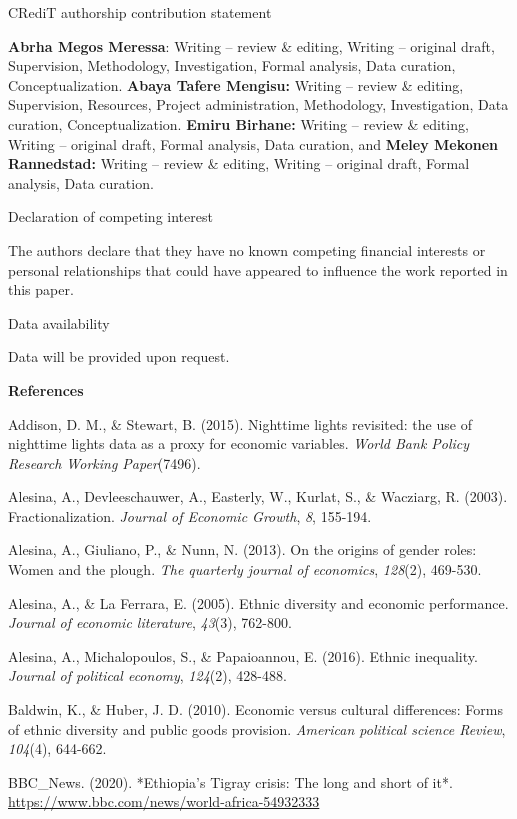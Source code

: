 CRediT authorship contribution statement

\textbf{Abrha Megos Meressa}: Writing -- review \& editing, Writing --
original draft, Supervision, Methodology, Investigation, Formal
analysis, Data curation, Conceptualization. \textbf{Abaya Tafere
Mengisu:} Writing -- review \& editing, Supervision, Resources, Project
administration, Methodology, Investigation, Data curation,
Conceptualization. \textbf{Emiru Birhane:} Writing -- review \& editing,
Writing -- original draft, Formal analysis, Data curation, and
\textbf{Meley Mekonen Rannedstad:} Writing -- review \& editing, Writing
-- original draft, Formal analysis, Data curation.

Declaration of competing interest

The authors declare that they have no known competing financial
interests or personal relationships that could have appeared to
influence the work reported in this paper.

Data availability

Data will be provided upon request.

\textbf{References}

Addison, D. M., \& Stewart, B. (2015). Nighttime lights revisited: the
use of nighttime lights data as a proxy for economic variables.
\emph{World Bank Policy Research Working Paper}(7496).

Alesina, A., Devleeschauwer, A., Easterly, W., Kurlat, S., \& Wacziarg,
R. (2003). Fractionalization. \emph{Journal of Economic Growth},
\emph{8}, 155-194.

Alesina, A., Giuliano, P., \& Nunn, N. (2013). On the origins of gender
roles: Women and the plough. \emph{The quarterly journal of economics},
\emph{128}(2), 469-530.

Alesina, A., \& La Ferrara, E. (2005). Ethnic diversity and economic
performance. \emph{Journal of economic literature}, \emph{43}(3),
762-800.

Alesina, A., Michalopoulos, S., \& Papaioannou, E. (2016). Ethnic
inequality. \emph{Journal of political economy}, \emph{124}(2), 428-488.

Baldwin, K., \& Huber, J. D. (2010). Economic versus cultural
differences: Forms of ethnic diversity and public goods provision.
\emph{American political science Review}, \emph{104}(4), 644-662.

BBC\_News. (2020). *Ethiopia's Tigray crisis: The long and short of it*.
\url{https://www.bbc.com/news/world-africa-54932333}

